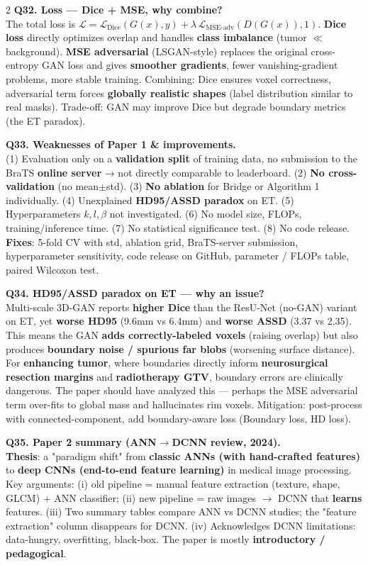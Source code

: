 \begin{paracol}{2}
\textbf{Q32. Loss — Dice + MSE, why combine?}\\
The total loss is $\mathcal{L}=\mathcal{L}_{\text{Dice}}(G(x),y)+\lambda\,\mathcal{L}_{\text{MSE-adv}}(D(G(x)),1).$ \textbf{Dice loss} directly optimizes overlap and handles \textbf{class imbalance} (tumor $\ll$ background). \textbf{MSE adversarial} (LSGAN-style) replaces the original cross-entropy GAN loss and gives \textbf{smoother gradients}, fewer vanishing-gradient problems, more stable training. Combining: Dice ensures voxel correctness, adversarial term forces \textbf{globally realistic shapes} (label distribution similar to real masks). Trade-off: GAN may improve Dice but degrade boundary metrics (the ET paradox).

\textbf{Q33. Weaknesses of Paper 1 \& improvements.}\\
(1) Evaluation only on a \textbf{validation split} of training data, no submission to the BraTS \textbf{online server} → not directly comparable to leaderboard. (2) \textbf{No cross-validation} (no mean$\pm$std). (3) \textbf{No ablation} for Bridge or Algorithm 1 individually. (4) Unexplained \textbf{HD95/ASSD paradox} on ET. (5) Hyperparameters $k,l,\beta$ not investigated. (6) No model size, FLOPs, training/inference time. (7) No statistical significance test. (8) No code release. \textbf{Fixes}: 5-fold CV with std, ablation grid, BraTS-server submission, hyperparameter sensitivity, code release on GitHub, parameter / FLOPs table, paired Wilcoxon test.

\textbf{Q34. HD95/ASSD paradox on ET — why an issue?}\\
Multi-scale 3D-GAN reports \textbf{higher Dice} than the ResU-Net (no-GAN) variant on ET, yet \textbf{worse HD95} (9.6mm vs 6.4mm) and \textbf{worse ASSD} (3.37 vs 2.35). This means the GAN \textbf{adds correctly-labeled voxels} (raising overlap) but also produces \textbf{boundary noise / spurious far blobs} (worsening surface distance). For \textbf{enhancing tumor}, where boundaries directly inform \textbf{neurosurgical resection margins} and \textbf{radiotherapy GTV}, boundary errors are clinically dangerous. The paper should have analyzed this — perhaps the MSE adversarial term over-fits to global mass and hallucinates rim voxels. Mitigation: post-process with connected-component, add boundary-aware loss (Boundary loss, HD loss).

\textbf{Q35. Paper 2 summary (ANN$\to$DCNN review, 2024).}\\
\textbf{Thesis}: a "paradigm shift" from \textbf{classic ANNs (with hand-crafted features)} to \textbf{deep CNNs (end-to-end feature learning)} in medical image processing. Key arguments: (i) old pipeline = manual feature extraction (texture, shape, GLCM) + ANN classifier; (ii) new pipeline = raw images $\to$ DCNN that \textbf{learns} features. (iii) Two summary tables compare ANN vs DCNN studies; the "feature extraction" column disappears for DCNN. (iv) Acknowledges DCNN limitations: data-hungry, overfitting, black-box. The paper is mostly \textbf{introductory / pedagogical}.


\end{paracol}
